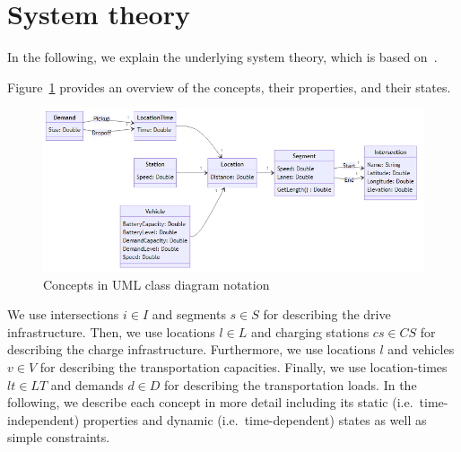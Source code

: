 \documentclass[graybox]{svmult}
\begin{document}
\newpage

\section{System theory}
\label{sec:theory}
In the following, we explain the underlying system theory, which is based on~\cite{Ascher2014,Ascher2015,Ascher2016,Ascher2017}.





Figure~\ref{fig:concepts} provides an overview of the concepts, their properties, and their states.
\begin{figure}[t]
	\centering
	\includegraphics[scale=0.35]{../../diagrams/model/classes-v0.png}
	\caption{Concepts in UML class diagram notation}
	\label{fig:concepts}
\end{figure}
We use intersections $i \in I$ and segments $s \in S$ for describing the drive infrastructure.
Then, we use locations $l \in L$ and charging stations $cs \in CS$ for describing the charge infrastructure.
Furthermore, we use locations $l$ and vehicles $v \in V$ for describing the transportation capacities.
Finally, we use location-times $lt \in LT$ and demands $d \in D$ for describing the transportation loads.
In the following, we describe each concept in more detail including its static (i.e.\ time-independent) properties and dynamic (i.e.\ time-dependent) states as well as simple constraints.
\end{document}
